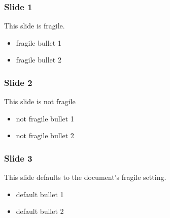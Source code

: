 \documentclass[t,english]{beamer}
\begin{document}
\begin{frame}[fragile]
\frametitle{Slide 1}


This slide is fragile.
\begin{itemize}[<+-| alert@+>]

\item fragile bullet 1

\item fragile bullet 2
\end{itemize}
\end{frame}

\begin{frame}
\frametitle{Slide 2}


This slide is not fragile
\begin{itemize}[<+-| alert@+>]

\item not fragile bullet 1

\item not fragile bullet 2
\end{itemize}
\end{frame}

\begin{frame}[fragile]
\frametitle{Slide 3}


This slide defaults to the document's fragile setting.
\begin{itemize}[<+-| alert@+>]

\item default bullet 1

\item default bullet 2
\end{itemize}
\end{frame}
\end{document}
